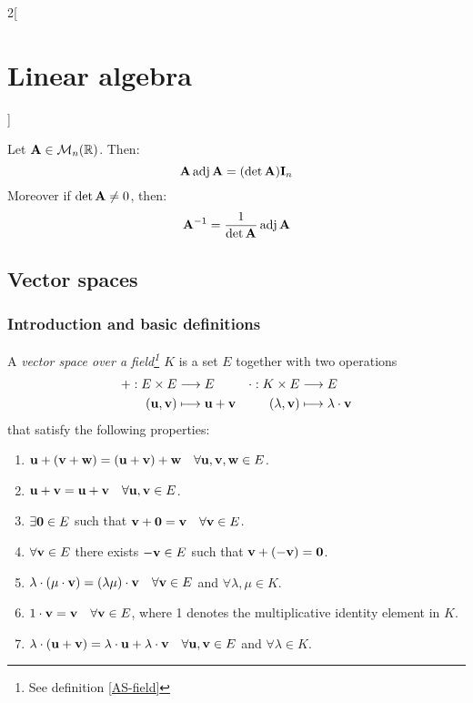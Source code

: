 \documentclass[../../../main.tex]{subfiles}
\begin{document}
\begin{multicols}{2}[\section{Linear algebra}]
\begin{definition}
\end{definition}
\begin{theorem}
    Let $\vb{A}\in\mathcal{M}_n(\mathbb{R})$. Then: $$\vb{A}\operatorname{adj}\vb{A}=(\det \vb{A})\vb{I}_n$$ Moreover if $\det \vb{A}\ne 0$, then: $$\vb{A}^{-1}=\frac{1}{\det \vb{A}}\operatorname{adj}\vb{A}$$
\end{theorem}
\subsection{Vector spaces}
\subsubsection*{Introduction and basic definitions}
\begin{definition}
    A \textit{vector space over a field\footnote{See definition \ref{AS-field}} $K$} is a set $E$ together with two operations
    \begin{align*}
        +:E\times E&\longrightarrow E&\cdot:K\times E&\longrightarrow E\\
        (\vb{u},\vb{v})&\longmapsto \vb{u}+ \vb{v}&(\lambda,\vb{v})&\longmapsto \lambda\cdot \vb{v}
    \end{align*}
    that satisfy the following properties:
    \begin{enumerate}
        \item $\vb{u}+(\vb{v}+\vb{w})=(\vb{u}+\vb{v})+\vb{w}\quad\forall\vb{u},\vb{v},\vb{w}\in E$.
        \item $\vb{u}+\vb{v}=\vb{u}+\vb{v}\quad\forall\vb{u},\vb{v}\in E$.
        \item $\exists\vb{0}\in E$ such that $\vb{v}+\vb{0}=\vb{v}\quad\forall\vb{v}\in E$.
        \item $\forall\vb{v}\in E$ there exists $-\vb{v}\in E$ such that $\vb{v}+(-\vb{v})=\vb{0}$.                  
        \item $\lambda\cdot(\mu\cdot\vb{v})=(\lambda\mu)\cdot\vb{v}\quad\forall\vb{v}\in E$ and $\forall\lambda,\mu\in K$. 
        \item $1\cdot\vb{v}=\vb{v}\quad\forall\vb{v}\in E$, where 1 denotes the multiplicative identity element in $K$.
        \item $\lambda\cdot(\vb{u}+\vb{v})=\lambda\cdot\vb{u}+\lambda\cdot\vb{v}\quad\forall\vb{u},\vb{v}\in E$ and $\forall\lambda\in K$.

\end{enumerate}
\end{definition}
\end{multicols}
\end{document}

